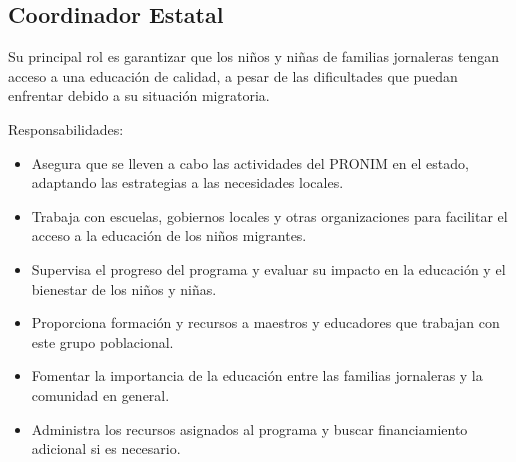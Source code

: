 	\begin{Usuario}{\hypertarget{CoordinadorEstatal}{\subsection{Coordinador Estatal}}}{
			Su principal rol es garantizar que los niños y niñas de familias jornaleras tengan acceso a una educación de calidad, a pesar de las dificultades que puedan enfrentar debido a su situación migratoria.
		}
		\item[Responsabilidades:] \cdtEmpty
		\begin{itemize}
			\item Asegura que se lleven a cabo las actividades del PRONIM en el estado, adaptando las estrategias a las necesidades locales.
			\item Trabaja con escuelas, gobiernos locales y otras organizaciones para facilitar el acceso a la educación de los niños migrantes.
            \item  Supervisa el progreso del programa y evaluar su impacto en la educación y el bienestar de los niños y niñas.
            \item Proporciona formación y recursos a maestros y educadores que trabajan con este grupo poblacional.
            \item  Fomentar la importancia de la educación entre las familias jornaleras y la comunidad en general.
            \item Administra los recursos asignados al programa y buscar financiamiento adicional si es necesario.
		\end{itemize}
		

\end{Usuario}
